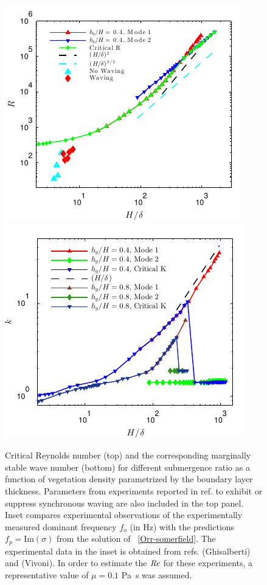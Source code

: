 \documentclass{jfm}
\begin{document}
\begin{figure}
\begin{center}
\includegraphics[scale = 0.95]{new_graph_R_vs_delta}\includegraphics[scale = 0.95]{new_graph_K_vs_delta}
\end{center}
\caption{
Critical Reynolds number (top) and the corresponding marginally stable wave number (bottom) for different submergence ratio as a function of vegetation density parametrized by the boundary layer thickness. 
Parameters from experiments reported in ref. \cite{Ghisal02} to exhibit or suppress synchronous waving are also included in the top panel. 
Inset compares experimental observations of the experimentally measured dominant frequency $f_o$ (in Hz) with the predictions $f_p=\text{Im}(\sigma)$ from the solution of ~\eqref{Orr-somerfield}. 
The experimental data in the inset is obtained from refs. \cite{Ghisal02} (Ghisalberti) and \cite{Vivoni98} (Vivoni). 
In order to estimate the $\mbox{\textit{Re}}$ for these experiments, a representative value of $\mu=0.1$ Pa~s was assumed.
}
\label{Re_vs_delta}
\end{figure}
\end{document}
